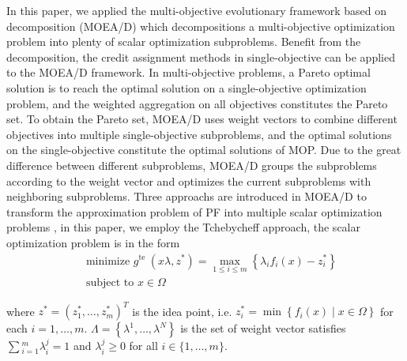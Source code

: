 \documentclass[journal]{IEEEtran}
\begin{document}
In this paper, we applied the multi-objective evolutionary framework based on decomposition (MOEA/D) \cite{moead} which decompositions a multi-objective optimization problem into plenty of scalar optimization subproblems. Benefit from the decomposition, the credit assignment methods in single-objective can be applied to the MOEA/D framework.
In multi-objective problems, a Pareto optimal solution is to reach the optimal solution on a single-objective optimization problem, and the weighted aggregation on all objectives constitutes the Pareto set.
To obtain the Pareto set, MOEA/D uses weight vectors to combine different objectives into multiple single-objective subproblems, and the optimal solutions on the single-objective constitute the optimal solutions of MOP.
Due to the great difference between different subproblems, MOEA/D groups the subproblems according to the weight vector and optimizes the current subproblems with neighboring subproblems.
Three approachs are introduced in MOEA/D to transform the approximation problem of PF into multiple scalar optimization problems \cite{moead}, in this paper, we employ the Tchebycheff approach, the scalar optimization problem is in the form
\begin{equation}
    \begin{aligned}
         & \text { minimize } g^{\text {te }}\left(x \lambda, z^{*}\right)=\max _{1 \leq i \leq m}\left\{\lambda_{i} f_{i}(x)-z_{i}^{*}\right\} \\
         & \text { subject to } x \in \Omega
    \end{aligned}
\end{equation}

where $z^{*}=\left(z_{1}^{*}, \ldots, z_{m}^{*}\right)^{T}$ is the idea point, i.e. $z_{i}^{*}=\min \left\{f_{i}(x) \mid x \in \Omega\right\}$ for each $i = 1, \dots , m$. $\Lambda=\left\{\lambda^{1}, \ldots, \lambda^{N}\right\}$ is the set of weight vector satisfies $\sum{^m_{i=1} \lambda ^j_i=1}$ and $\lambda^j_i \geq 0$ for all $i \in \{1,\dots, m\}$.
\end{document}
